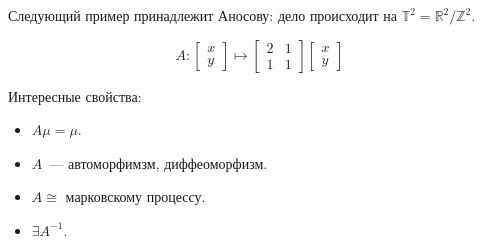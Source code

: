 \documentclass{article}
\begin{document}
Следующий пример принадлежит Аносову: дело происходит на $\mathbb{T}^2 =
\mathbb{R}^2 / \mathbb{Z}^2$.

$$ A: \begin{bmatrix}x\\y\end{bmatrix} \mapsto \begin{bmatrix}2 & 1\\
1 & 1\end{bmatrix}\begin{bmatrix}x\\y\end{bmatrix}$$

Интересные свойства:
\begin{itemize}
	\item $A\mu = \mu$.
	\item $A$~--- автоморфимзм, диффеоморфизм.
	\item $A \cong $ марковскому процессу.
	\item $\exists A^{-1}$.
\end{itemize}
\end{document}
